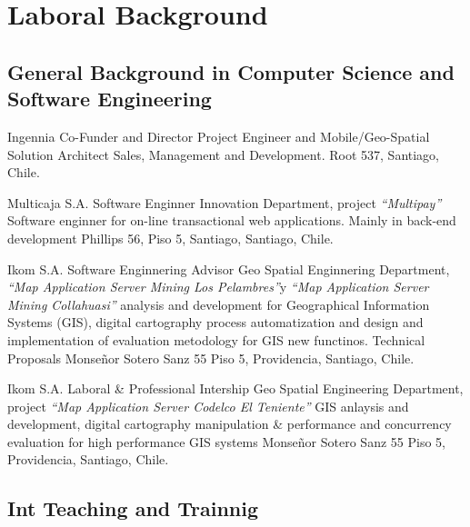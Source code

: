 
\section{Laboral Background}

\subsection{General Background in Computer Science and Software Engineering}
	{Ingennia} %
	{Co-Funder and Director} %
	{Project Engineer and Mobile/Geo-Spatial Solution Architect}
	{Sales, Management and Development.}
	{Root 537, Santiago, Chile.}
	

	{Multicaja S.A.} %
	{Software Enginner} %
	{Innovation Department, project \textit{``Multipay''}}
	{Software enginner for on-line transactional web applications. Mainly in back-end development}
	{Phillips 56, Piso 5, Santiago, Santiago, Chile.}

	{Ikom S.A.}	%
	{Software Enginnering Advisor}
	{Geo Spatial Enginnering Department,
	\textit{``Map Application Server Mining Los Pelambres''}y \textit{``Map Application Server Mining 
	Collahuasi''}}
	{analysis and development for Geographical Information Systems (GIS), digital cartography process automatization and design and implementation of evaluation metodology for GIS new functinos. Technical Proposals}
	{Monse\~nor Sotero Sanz 55 Piso 5, Providencia, Santiago, Chile.}
	

	{Ikom S.A.}	%
	{Laboral \& Professional Intership} %
	{Geo Spatial Engineering Department, project 
	\textit{``Map Application Server Codelco El Teniente''}}
	{GIS anlaysis and development, digital cartography manipulation \&
performance and concurrency evaluation for high performance GIS systems}
	{Monse\~nor Sotero Sanz 55 Piso 5, Providencia, Santiago, Chile.}
	
	

\subsection{Int Teaching and Trainnig}
	
